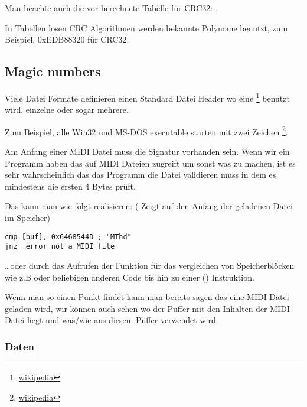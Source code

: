 Man beachte auch die vor berechnete Tabelle f\"ur CRC32: .

In Tabellen losen CRC Algorithmen werden bekannte Polynome benutzt, zum Beispiel, 0xEDB88320 f\"ur CRC32.

\subsection{Magic numbers}
\label{magic_numbers}

\newcommand{\FNURLMAGIC}{\footnote{\href{http://go.yurichev.com/17112}{wikipedia}}}

Viele Datei Formate definieren einen Standard Datei Header wo eine \FNURLMAGIC{} benutzt wird, einzelne oder
sogar mehrere. 


Zum Beispiel, alle Win32 und MS-DOS executable starten mit zwei Zeichen \footnote{\href{http://go.yurichev.com/17113}{wikipedia}}.



Am Anfang einer MIDI Datei muss die  Signatur vorhanden sein.
Wenn wir ein Programm haben das auf MIDI Dateien zugreift um sonst was zu machen,
ist es sehr wahrscheinlich das das Programm die Datei validieren muss in dem es
mindestens die ersten 4 Bytes pr\"uft.

Das kann man wie folgt realisieren:
( Zeigt auf den Anfang der geladenen Datei im Speicher) 

\begin{lstlisting}[style=customasmx86]
cmp [buf], 0x6468544D ; "MThd"
jnz _error_not_a_MIDI_file
\end{lstlisting}


\dots oder durch das Aufrufen der Funktion f\"ur das vergleichen von Speicherbl\"ocken wie z.B  oder 
beliebigen anderen Code bis hin zu einer  () Instruktion.

Wenn man so einen Punkt findet kann man bereits sagen das eine MIDI Datei geladen wird, %
wir k\"onnen auch sehen wo der Puffer mit den Inhalten der MIDI Datei liegt und was/wie aus diesem
Puffer verwendet wird.

\subsubsection{Daten}

